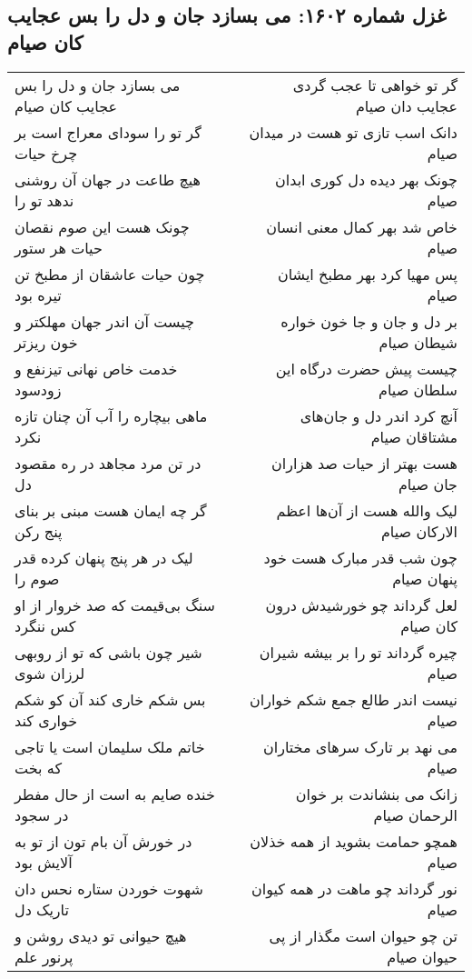 \begin{center}
\section*{غزل شماره ۱۶۰۲: می بسازد جان و دل را بس عجایب کان صیام}
\label{sec:1602}
\begin{longtable}{l p{0.5cm} r}
می بسازد جان و دل را بس عجایب کان صیام
&&
گر تو خواهی تا عجب گردی عجایب دان صیام
\\
گر تو را سودای معراج است بر چرخ حیات
&&
دانک اسب تازی تو هست در میدان صیام
\\
هیچ طاعت در جهان آن روشنی ندهد تو را
&&
چونک بهر دیده دل کوری ابدان صیام
\\
چونک هست این صوم نقصان حیات هر ستور
&&
خاص شد بهر کمال معنی انسان صیام
\\
چون حیات عاشقان از مطبخ تن تیره بود
&&
پس مهیا کرد بهر مطبخ ایشان صیام
\\
چیست آن اندر جهان مهلکتر و خون ریزتر
&&
بر دل و جان و جا خون خواره شیطان صیام
\\
خدمت خاص نهانی تیزنفع و زودسود
&&
چیست پیش حضرت درگاه این سلطان صیام
\\
ماهی بیچاره را آب آن چنان تازه نکرد
&&
آنچ کرد اندر دل و جان‌های مشتاقان صیام
\\
در تن مرد مجاهد در ره مقصود دل
&&
هست بهتر از حیات صد هزاران جان صیام
\\
گر چه ایمان هست مبنی بر بنای پنج رکن
&&
لیک والله هست از آن‌ها اعظم الارکان صیام
\\
لیک در هر پنج پنهان کرده قدر صوم را
&&
چون شب قدر مبارک هست خود پنهان صیام
\\
سنگ بی‌قیمت که صد خروار از او کس ننگرد
&&
لعل گرداند چو خورشیدش درون کان صیام
\\
شیر چون باشی که تو از روبهی لرزان شوی
&&
چیره گرداند تو را بر بیشه شیران صیام
\\
بس شکم خاری کند آن کو شکم خواری کند
&&
نیست اندر طالع جمع شکم خواران صیام
\\
خاتم ملک سلیمان است یا تاجی که بخت
&&
می نهد بر تارک سرهای مختاران صیام
\\
خنده صایم به است از حال مفطر در سجود
&&
زانک می بنشاندت بر خوان الرحمان صیام
\\
در خورش آن بام تون از تو به آلایش بود
&&
همچو حمامت بشوید از همه خذلان صیام
\\
شهوت خوردن ستاره نحس دان تاریک دل
&&
نور گرداند چو ماهت در همه کیوان صیام
\\
هیچ حیوانی تو دیدی روشن و پرنور علم
&&
تن چو حیوان است مگذار از پی حیوان صیام

\end{longtable}
\end{center}
